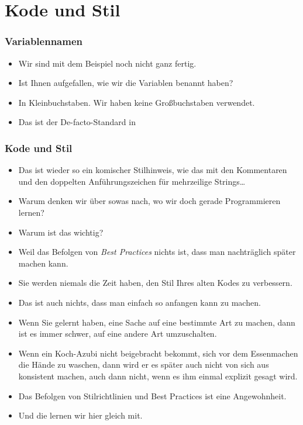 \documentclass[aspectratio=169,mathserif,notheorems]{beamer}%
\begin{document}
\section{Kode und Stil}%
%
\begin{frame}%
\frametitle{Variablennamen}%
\begin{itemize}%
\item Wir sind mit dem Beispiel noch nicht ganz fertig.%
\item<2-> Ist Ihnen aufgefallen, wie wir die Variablen benannt haben?%
\item<3-> In Kleinbuchstaben. Wir haben keine Großbuchstaben verwendet.%
\item<4-> Das ist der De-facto-Standard in \python{}%
\end{itemize}%
%
%
\end{frame}%
%
\begin{frame}%
\frametitle{Kode und Stil}%
\begin{itemize}%
\item Das ist wieder so ein komischer Stilhinweis, wie das mit den Kommentaren und den doppelten Anführungszeichen für mehrzeilige Strings\dots%
\item<2-> Warum denken wir über sowas nach, wo wir doch gerade Programmieren lernen?%
\item<3-> Warum ist das wichtig?%
\item<5-> Weil das Befolgen von \emph{Best Practices} nichts ist, dass man nachträglich später machen kann.%
\item<6-> Sie werden \alert{niemals} die Zeit haben, den Stil Ihres alten Kodes zu verbessern.%
\item<7-> Das ist auch nichts, dass man einfach so anfangen kann zu machen.%
\item<8-> Wenn Sie gelernt haben, eine Sache auf eine bestimmte Art zu machen, dann ist es immer schwer, auf eine andere Art umzuschalten.%
\item<9-> Wenn ein Koch-Azubi nicht beigebracht bekommt, sich vor dem Essenmachen die Hände zu waschen, dann wird er es später auch nicht von sich aus konsistent machen, auch dann nicht, wenn es ihm einmal explizit gesagt wird.%
\item<10-> Das Befolgen von Stilrichtlinien und Best Practices ist eine Angewohnheit.%
\item<11-> Und die lernen wir hier gleich mit.%
\end{itemize}%
\end{frame}%
\end{document}
